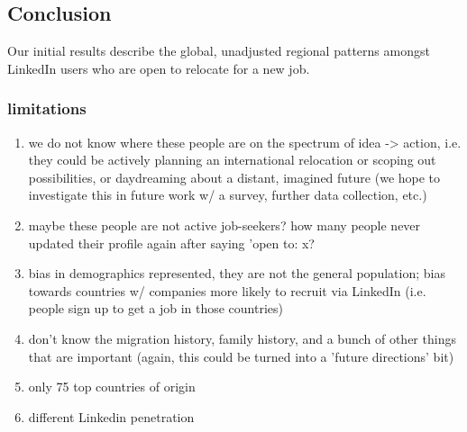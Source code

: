 \subsection*{Conclusion}
Our initial results describe the global, unadjusted regional patterns amongst LinkedIn users who are open to relocate for a new job.
\subsubsection*{limitations}
\begin{enumerate}
    \item we do not know where these people are on the spectrum of idea -> action, i.e. they could be actively planning an international relocation or scoping out possibilities, or daydreaming about a distant, imagined future (we hope to investigate this in future work w/ a survey, further data collection, etc.)
    \item maybe these people are not active job-seekers? how many people never updated their profile again after saying 'open to: x?
    \item bias in demographics represented, they are not the general population; bias towards countries w/ companies more likely to recruit via LinkedIn (i.e. people sign up to get a job in those countries)
    \item don't know the migration history, family history, and a bunch of other things that are important (again, this could be turned into a 'future directions' bit)
    \item only 75 top countries of origin
    \item different Linkedin penetration
\end{enumerate}
